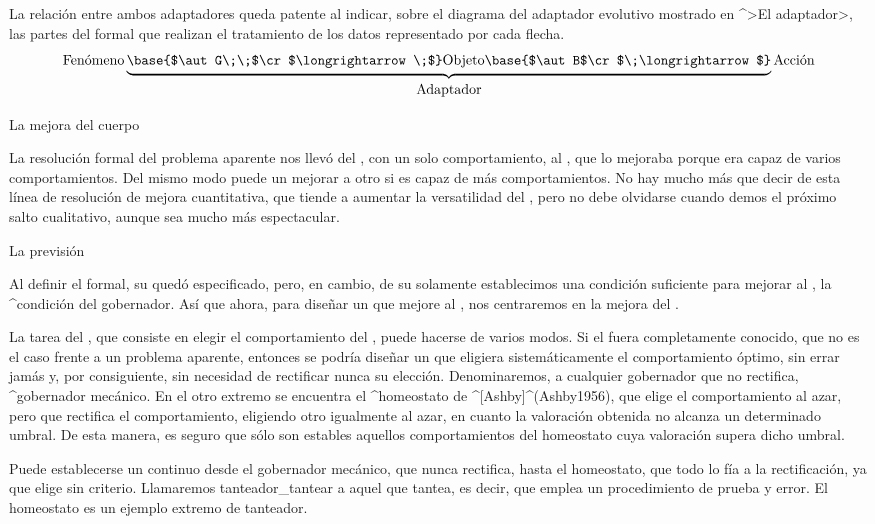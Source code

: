 La relación entre ambos adaptadores queda patente al indicar, sobre el
diagrama del adaptador evolutivo mostrado en ^>El adaptador>, las partes
del {\adaptador} formal que realizan el tratamiento de los datos
representado por cada flecha.
$$\hbox{Fenómeno}
  \underbrace{
   \base{$\aut G\;\;$\cr$\longrightarrow\;$}
   \hbox{\strut Objeto}
   \base{$\aut B$\cr$\;\longrightarrow$}}_{\hbox{\strut Adaptador}}
  \hbox{Acción}
$$


\Section La mejora del cuerpo

La resolución formal del problema aparente nos llevó del {\mecanismo},
con un solo comportamiento, al {\adaptador}, que lo mejoraba porque era
capaz de varios comportamientos. Del mismo modo puede un {\adaptador}
mejorar a otro si es capaz de más comportamientos. No hay mucho más que
decir de esta línea de resolución de mejora cuantitativa, que tiende a
aumentar la versatilidad del {\cuerpo}, pero no debe olvidarse cuando
demos el próximo salto cualitativo, aunque sea mucho más espectacular.


\Section La previsión

Al definir el {\adaptador} formal, su {\cuerpo} quedó especificado,
pero, en cambio, de su {\gobernador} solamente establecimos una
condición suficiente para mejorar al {\mecanismo}, la ^{condición del
gobernador}. Así que ahora, para diseñar un {\aprendiz} que mejore al
{\adaptador}, nos centraremos en la mejora del {\gobernador}.

La tarea del {\gobernador}, que consiste en elegir el comportamiento del
{\cuerpo}, puede hacerse de varios modos. Si el {\universo} fuera
completamente conocido, que no es el caso frente a un problema aparente,
entonces se podría diseñar un {\gobernador} que eligiera
sistemáticamente el comportamiento óptimo, sin errar jamás y, por
consiguiente, sin necesidad de rectificar nunca su elección.
Denominaremos, a cualquier gobernador que no rectifica, ^{gobernador
mecánico}. En el otro extremo se encuentra el ^{homeostato} de
^[Ashby]^(Ashby1956), que elige el comportamiento al azar, pero que
rectifica el comportamiento, eligiendo otro igualmente al azar, en
cuanto la valoración obtenida no alcanza un determinado umbral. De esta
manera, es seguro que sólo son estables aquellos comportamientos del
homeostato cuya valoración supera dicho umbral.

Puede establecerse un continuo desde el gobernador mecánico, que nunca
rectifica, hasta el homeostato, que todo lo fía a la rectificación, ya
que elige sin criterio. Llamaremos tanteador_{tantear} a aquel
{\gobernador} que tantea, es decir, que emplea un procedimiento de
prueba y error. El homeostato es un ejemplo extremo de tanteador.

